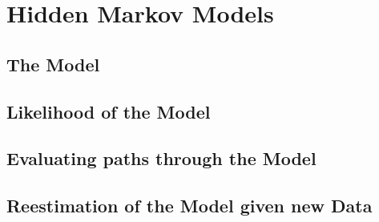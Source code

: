 \section{Hidden Markov Models}

\subsection{The Model}
\begin{frame}



\end{frame}

\subsection{Likelihood of the Model}
\begin{frame}



\end{frame}


\subsection{Evaluating paths through the Model}
\begin{frame}



\end{frame}

\subsection{Reestimation of the Model given new Data}
\begin{frame}



\end{frame}











